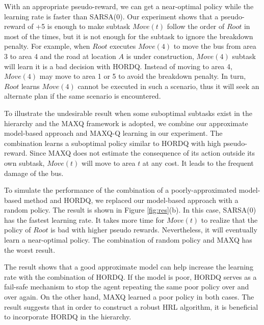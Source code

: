 With an appropriate pseudo-reward, we can get a near-optimal policy
while the learning rate is faster than SARSA(0).
Our experiment shows that a pseudo-reward of +5 is enough to make subtask $Move(t)$ follow 
the order of $Root$ in most of the times, but it is not enough for the subtask to ignore
the breakdown penalty. For example, when $Root$ executes $Move(4)$ to move the bus from area 
3 to area 4 and the road at location $A$ is under construction, $Move(4)$ subtask
will learn it is a bad decision with HORDQ.
Instead of moving to area 4, $Move(4)$ may move to area 1 or 5 to avoid
the breakdown penalty. In turn, $Root$ learns $Move(4)$ cannot be executed in 
such a scenario, thus it will seek an alternate plan if the same scenario
is encountered.

To illustrate the undesirable result when some suboptimal subtasks exist in 
the hierarchy and the MAXQ framework is adopted, we combine our approximate model-based approach
and MAXQ-Q learning in our experiment. The combination learns a suboptimal policy similar to HORDQ with high pseudo-reward. 
Since MAXQ does not estimate the consequence of its action outside its own subtask,
$Move(t)$ will move to area $t$ at any cost. It leads to the frequent damage of the bus.

To simulate the performance of the combination of a poorly-approximated model-based method and 
HORDQ, we replaced our model-based approach with a random policy.
The result is shown in Figure \ref{fig:res}(b). In this case, SARSA(0) has the fastest
learning rate. It takes more time for $Move(t)$ to realize that the policy of $Root$ is bad with higher pseudo rewards.
Nevertheless, it will eventually learn a near-optimal policy.
The combination of random policy and MAXQ has the worst result.

The result shows that a good approximate model 
can help increase the learning rate with the combination of HORDQ. 
If the model is poor, HORDQ serves as a fail-safe mechanism to stop 
the agent repeating the same poor policy over and over again.
On the other hand, MAXQ learned a poor policy in both cases.  
The result suggests that in order to construct a robust HRL 
algorithm, it is beneficial to incorporate HORDQ in the hierarchy.

